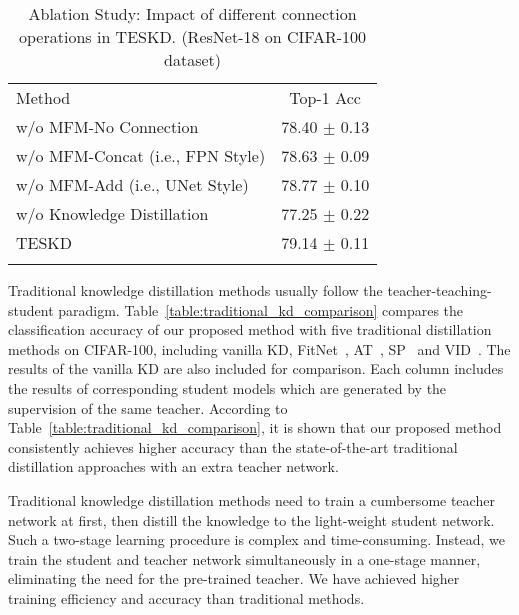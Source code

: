 \documentclass[letterpaper]{article} %
\begin{document}
\begin{table}
	\begin{center}
		\resizebox{0.85\linewidth}{!}
		{
			\begin{tabular}{lc}
				\hline\noalign{\smallskip}
				Method & Top-1 Acc \\
				\noalign{\smallskip}\hline\noalign{\smallskip}
				w/o MFM-No Connection             & 78.40 $\pm$ 0.13      \\ 
				w/o MFM-Concat (i.e., FPN Style)  & 78.63 $\pm$ 0.09      \\
				w/o MFM-Add (i.e., UNet Style)    & 78.77 $\pm$ 0.10      \\
				w/o Knowledge Distillation        & 77.25 $\pm$ 0.22      \\
				\noalign{\smallskip}\hline\noalign{\smallskip}
				TESKD                            & 79.14 $\pm$ 0.11      \\
				\noalign{\smallskip}\hline
			\end{tabular}
		}
		\caption{Ablation Study: Impact of different connection operations in TESKD. (ResNet-18 on CIFAR-100 dataset)}
		\label{table:mixed_link}
	\end{center}
\end{table}


Traditional knowledge distillation methods usually follow the teacher-teaching-student paradigm. Table~\ref{table:traditional_kd_comparison} compares the classification accuracy of our proposed method with five traditional distillation methods on CIFAR-100, including vanilla KD, FitNet~\cite{romero2014fitnets}, AT~\cite{zagoruyko2016paying}, SP~\cite{tung2019similarity} and VID~\cite{ahn2019variational}. The results of the vanilla KD are also included for comparison. Each column includes the results of corresponding student models which are generated by the supervision of the same teacher. According to Table~\ref{table:traditional_kd_comparison}, it is shown that our proposed method consistently achieves higher accuracy than the state-of-the-art traditional distillation approaches with an extra teacher network.

Traditional knowledge distillation methods need to train a cumbersome teacher network at first, then distill the knowledge to the light-weight student network. Such a two-stage learning procedure is complex and time-consuming. Instead, we train the student and teacher network simultaneously in a one-stage manner, eliminating the need for the pre-trained teacher. We have achieved higher training efficiency and accuracy than traditional methods.
\end{document}
